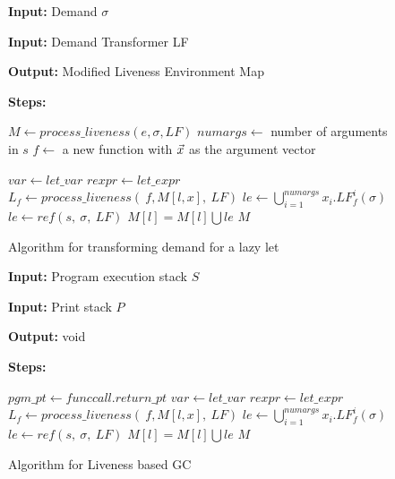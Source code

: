 \begin{figure}[t]
  \begin{boxedminipage}{\textwidth}
    \begin{center}
      \raggedright  {\bf  Input:}  Demand $\sigma$ \\
      \raggedright  {\bf  Input:}  Demand Transformer LF \\
      \raggedright{\bf Output:} Modified Liveness Environment Map
      \\
      \raggedright{\bf Steps:}
      \begin{algorithmic}
        \STATE $M \leftarrow process\_liveness(e, \sigma, LF)$
        \STATE $numargs \leftarrow$ number of arguments in $s$
        \STATE $f \leftarrow$ a new function with $\myvec{x}$ as the argument vector
        
        \STATE $var \leftarrow let\_var$ 
        \STATE $rexpr \leftarrow let\_expr$
        \STATE $L_f \leftarrow process\_liveness (\ f, M[l, x],\ LF)$
        \STATE $le \leftarrow \bigcup_{i=1}^{numargs} x_i.LF_{f}^{i}({\sigma})$
        \ELSE
        \STATE  $le \leftarrow  ref (s,\ \sigma,\ LF)$
        \ENDIF
        \STATE $M[l] = M[l] \bigcup le$
        \ENDFOR
        \RETURN $M$
      \end{algorithmic}
    \end{center}
  \end{boxedminipage}
  \caption{Algorithm for transforming demand for a lazy let}\label{algo:transform-lazy-let} \figrule
\end{figure}

\begin{figure}[t]
  \begin{boxedminipage}{\textwidth}
    \begin{center}
      \raggedright  {\bf  Input:}  Program execution stack  $S$ \\
      \raggedright  {\bf  Input:}  Print stack $P$ \\
      \raggedright{\bf Output:} void \\
      \raggedright{\bf Steps:}
      \begin{algorithmic}
        \STATE $pgm\_pt \leftarrow funccall.return\_pt$
        \STATE $var \leftarrow let\_var$ 
        \STATE $rexpr \leftarrow let\_expr$
        \STATE $L_f \leftarrow process\_liveness (\ f, M[l, x],\ LF)$
        \STATE $le \leftarrow \bigcup_{i=1}^{numargs} x_i.LF_{f}^{i}({\sigma})$
        \ELSE
        \STATE  $le \leftarrow  ref (s,\ \sigma,\ LF)$
        \ENDIF
        \STATE $M[l] = M[l] \bigcup le$
        \ENDFOR
        \ENDFOR
        \RETURN $M$
      \end{algorithmic}
    \end{center}
  \end{boxedminipage}
  \caption{Algorithm for Liveness based GC}\label{algo:lazy-lgc} \figrule
\end{figure}
